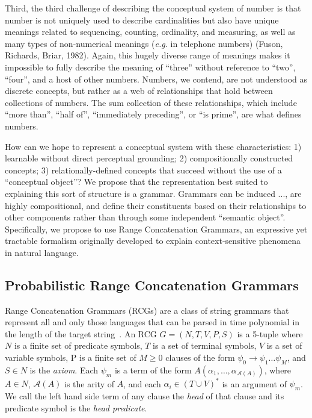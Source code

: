 \documentclass[10pt,letterpaper]{article}
\begin{document}
Third, the third challenge of describing the conceptual system of
number is that number is not uniquely used to describe cardinalities
but also have unique meanings related to sequencing, counting,
ordinality, and measuring, as well as many types of non-numerical
meanings ({\it e.g.} in telephone numbers) (Fuson, Richards, Briar,
1982). Again, this hugely diverse range of meanings makes it
impossible to fully describe the meaning of ``three'' without
reference to ``two'', ``four'', and a host of other numbers. Numbers,
we contend, are not understood as discrete concepts, but rather as a
web of relationships that hold between collections of numbers. The sum
collection of these relationships, which include ``more than'', ``half
of'', ``immediately preceding'', or ``is prime'', are what defines
numbers.

How can we hope to represent a conceptual system with these
characteristics: 1) learnable without direct perceptual grounding; 2)
compositionally constructed concepts; 3) relationally-defined concepts
that succeed without the use of a ``conceptual object''? We propose
that the representation best suited to explaining this sort of
structure is a grammar. Grammars can be induced ..., are highly
compositional, and define their constituents based on their
relationships to other components rather than through some independent
``semantic object''. Specifically, we propose to use Range
Concatenation Grammars, an expressive yet tractable formalism
originally developed to explain context-sensitive phenomena in natural
language.

\subsection{Probabilistic Range Concatenation Grammars}

Range Concatenation Grammars (RCGs) are a class of string grammars
that represent all and only those languages that can be parsed in time
polynomial in the length of the target
string~\cite{boullier2005range}. An RCG $G=(N, T, V, P, S)$ is a
5-tuple where $N$ is a finite set of predicate symbols, $T$ is a set
of terminal symbols, $V$ is a set of variable symbols, P is a finite
set of $M \geq 0$ clauses of the form $\psi_0 \rightarrow \psi_1 \dots
\psi_M$, and $S \in N$ is the \emph{axiom}. Each $\psi_m$ is a term of
the form $A(\alpha_1, \dots, \alpha_{\mathcal{A}(A)})$, where $A \in
N$, $\mathcal{A}(A)$ is the arity of $A$, and each $\alpha_i \in (T
\cup V)^*$ is an argument of $\psi_m$. We call the left hand side term
of any clause the \emph{head} of that clause and its predicate symbol
is the \emph{head predicate}.
\end{document}
